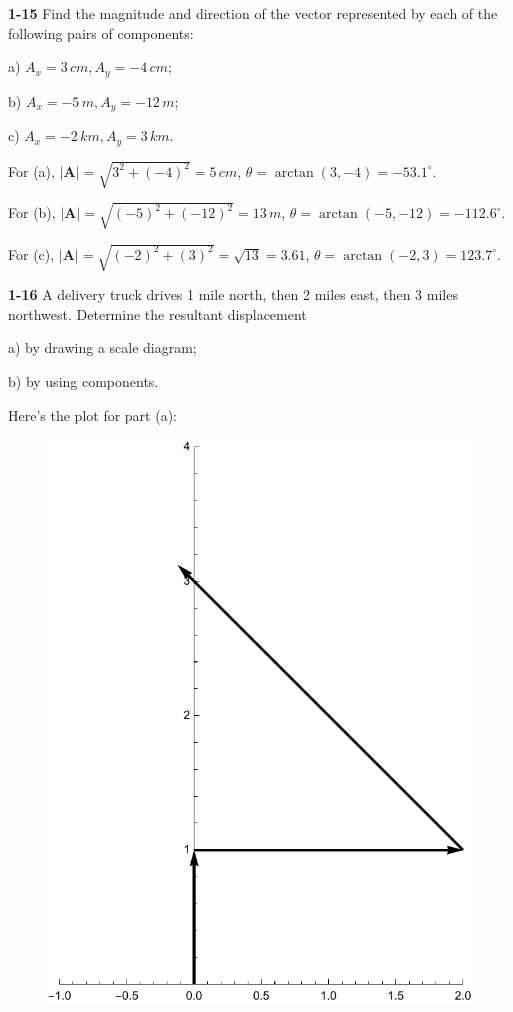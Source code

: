 \documentclass{amsart}
\begin{document}
\textbf{1-15} Find the magnitude and direction of the vector represented by each of the following pairs of components:

a) $A_x = 3\,cm, A_y = -4\,cm$;

b) $A_x = -5\,m, A_y = -12\,m$;

c) $A_x = -2\,km, A_y = 3\,km$.

For (a), $|\textbf{A}| = \sqrt{3^2 + (-4)^2} = 5\,cm$, $\theta = \arctan(3,-4) = -53.1^\circ$.

For (b), $|\textbf{A}| = \sqrt{(-5)^2 + (-12)^2} = 13\,m$, $\theta = \arctan(-5,-12) = -112.6^\circ$.

For (c), $|\textbf{A}| = \sqrt{(-2)^2 + (3)^2} = \sqrt{13} = 3.61$, $\theta = \arctan(-2,3) = 123.7^\circ$.

\textbf{1-16} A delivery truck drives 1 mile north, then 2 miles east, then 3 miles northwest.  Determine the resultant displacement

a) by drawing a scale diagram;

b) by using components.

Here's the plot for part (a):

\begin{figure}[h]
\includegraphics[scale=0.32]{1-16}
\end{figure}
\end{document}
